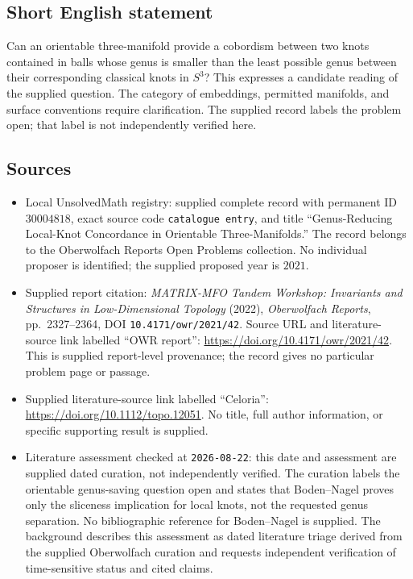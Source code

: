 \documentclass[11pt]{article}
\begin{document}
\subsection{Short English statement}
Can an orientable three-manifold provide a cobordism between two knots contained in balls whose genus is smaller than the least possible genus between their corresponding classical knots in \(S^3\)? This expresses a candidate reading of the supplied question. The category of embeddings, permitted manifolds, and surface conventions require clarification. The supplied record labels the problem open; that label is not independently verified here.
\subsection{Sources}
\begin{itemize}
\item Local UnsolvedMath registry: supplied complete record with permanent ID \(30004818\), exact source code \texttt{catalogue entry}, and title ``Genus-Reducing Local-Knot Concordance in Orientable Three-Manifolds.'' The record belongs to the Oberwolfach Reports Open Problems collection. No individual proposer is identified; the supplied proposed year is \(2021\).
\item Supplied report citation: \emph{MATRIX-MFO Tandem Workshop: Invariants and Structures in Low-Dimensional Topology} (2022), \emph{Oberwolfach Reports}, pp.~2327--2364, DOI \texttt{10.4171/owr/2021/42}. Source URL and literature-source link labelled ``OWR report'': \url{https://doi.org/10.4171/owr/2021/42}. This is supplied report-level provenance; the record gives no particular problem page or passage.
\item Supplied literature-source link labelled ``Celoria'': \url{https://doi.org/10.1112/topo.12051}. No title, full author information, or specific supporting result is supplied.
\item Literature assessment checked at \texttt{2026-08-22}: this date and assessment are supplied dated curation, not independently verified. The curation labels the orientable genus-saving question open and states that Boden--Nagel proves only the sliceness implication for local knots, not the requested genus separation. No bibliographic reference for Boden--Nagel is supplied. The background describes this assessment as dated literature triage derived from the supplied Oberwolfach curation and requests independent verification of time-sensitive status and cited claims.
\end{itemize}
\end{document}
